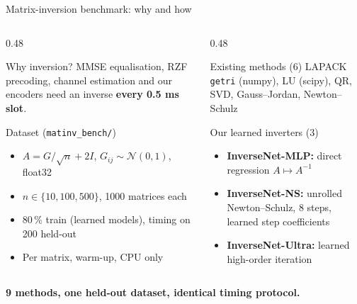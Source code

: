 \documentclass[aspectratio=169,11pt,xcolor=table]{beamer}
\newcommand{\hl}[1]{\textcolor{accent}{\textbf{#1}}}
\newcommand{\takeaway}[1]{%
  \vfill
  \begin{alertblock}{}\centering\textbf{#1}\end{alertblock}}
\begin{document}
\begin{frame}{Matrix-inversion benchmark: why and how}
  \begin{columns}[T]
    \begin{column}{0.48\textwidth}
      \begin{block}{Why inversion?}
        \small MMSE equalisation, RZF precoding, channel estimation and our encoders
        need an inverse \hl{every 0.5 ms slot}.
      \end{block}
      \begin{block}{Dataset (\texttt{matinv\_bench/})}
        \begin{itemize}\small
          \item $A = G/\sqrt{n} + 2I$, \; $G_{ij}\sim\mathcal N(0,1)$, float32
          \item $n \in \{10, 100, 500\}$, 1000 matrices each
          \item 80\,\% train (learned models), timing on 200 held-out
          \item Per matrix, warm-up, CPU only
        \end{itemize}
      \end{block}
    \end{column}
    \begin{column}{0.48\textwidth}
      \begin{block}{Existing methods (6)}
        LAPACK \texttt{getri} (numpy), LU (scipy), QR, SVD, Gauss--Jordan, Newton--Schulz
      \end{block}
      \begin{exampleblock}{Our learned inverters (3)}
        \begin{itemize}\small
          \item \textbf{InverseNet-MLP:} direct regression $A \mapsto A^{-1}$
          \item \textbf{InverseNet-NS:} unrolled Newton--Schulz, 8 steps, learned step coefficients
          \item \textbf{InverseNet-Ultra:} learned high-order iteration
        \end{itemize}
      \end{exampleblock}
    \end{column}
  \end{columns}
  \takeaway{9 methods, one held-out dataset, identical timing protocol.}
\end{frame}
\end{document}
